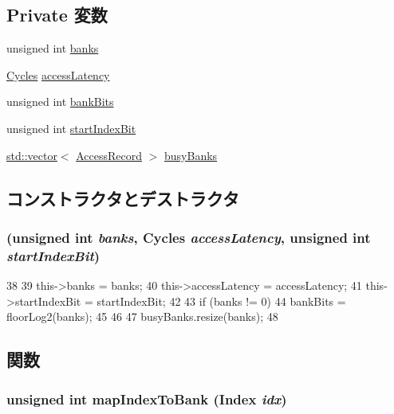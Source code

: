 \subsection*{Private 変数}
\begin{DoxyCompactItemize}
\item 
unsigned int \hyperlink{classBankedArray_af3bc5dde442d2943c967e6a619b651db}{banks}
\item 
\hyperlink{classCycles}{Cycles} \hyperlink{classBankedArray_a22569642d188db2401013daf3c1aaf80}{accessLatency}
\item 
unsigned int \hyperlink{classBankedArray_a2061a8d117a013455257a1ac4159052a}{bankBits}
\item 
unsigned int \hyperlink{classBankedArray_aaf805bffe08ab5ee80012f43977189b7}{startIndexBit}
\item 
\hyperlink{classstd_1_1vector}{std::vector}$<$ \hyperlink{classBankedArray_1_1AccessRecord}{AccessRecord} $>$ \hyperlink{classBankedArray_a26ac330c6dbf83377648d992382927a4}{busyBanks}
\end{DoxyCompactItemize}


\subsection{コンストラクタとデストラクタ}
\hypertarget{classBankedArray_acc56123dfcfdbbbee495007c8f90d8a3}{
\subsubsection[{BankedArray}]{ (unsigned int {\em banks}, \/  {\bf Cycles} {\em accessLatency}, \/  unsigned int {\em startIndexBit})}}
\label{classBankedArray_acc56123dfcfdbbbee495007c8f90d8a3}



\begin{DoxyCode}
38 {
39     this->banks = banks;
40     this->accessLatency = accessLatency;
41     this->startIndexBit = startIndexBit;
42 
43     if (banks != 0) {
44         bankBits = floorLog2(banks);
45     }
46 
47     busyBanks.resize(banks);
48 }
\end{DoxyCode}


\subsection{関数}
\hypertarget{classBankedArray_aab452493f7e91865f85df9ff3fe64bbc}{
\subsubsection[{mapIndexToBank}]{\setlength{\rightskip}{0pt plus 5cm}unsigned int mapIndexToBank ({\bf Index} {\em idx})}}
\label{classBankedArray_aab452493f7e91865f85df9ff3fe64bbc}




